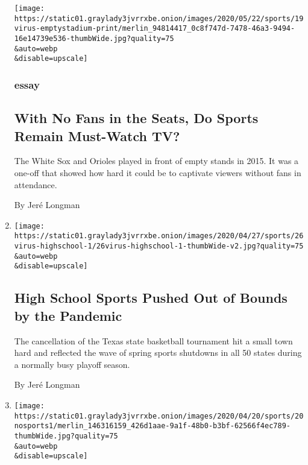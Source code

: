 \begin{enumerate}
  \texttt{[image: https://static01.graylady3jvrrxbe.onion/images/2020/05/22/sports/19virus-emptystadium-print/merlin\_94814417\_0c8f747d-7478-46a3-9494-16e14739e536-thumbWide.jpg?quality=75\\\&auto=webp\\\&disable=upscale]}

  \hypertarget{essay}{%
  \subsubsection{essay}\label{essay}}

  \hypertarget{with-no-fans-in-the-seats-do-sports-remain-must-watch-tv}{%
  \subsection{With No Fans in the Seats, Do Sports Remain Must-Watch
  TV?}\label{with-no-fans-in-the-seats-do-sports-remain-must-watch-tv}}

  The White Sox and Orioles played in front of empty stands in 2015. It
  was a one-off that showed how hard it could be to captivate viewers
  without fans in attendance.

  By Jeré Longman
\item
  \href{/2020/04/26/sports/coronavirus-high-school-sports.html}{}

  \texttt{[image: https://static01.graylady3jvrrxbe.onion/images/2020/04/27/sports/26virus-highschool-1/26virus-highschool-1-thumbWide-v2.jpg?quality=75\\\&auto=webp\\\&disable=upscale]}

  \hypertarget{high-school-sports-pushed-out-of-bounds-by-the-pandemic}{%
  \subsection{High School Sports Pushed Out of Bounds by the
  Pandemic}\label{high-school-sports-pushed-out-of-bounds-by-the-pandemic}}

  The cancellation of the Texas state basketball tournament hit a small
  town hard and reflected the wave of spring sports shutdowns in all 50
  states during a normally busy playoff season.

  By Jeré Longman
\item
  \href{/2020/04/20/sports/German-Silva-treadmill-drive-in-soccer-virus.html}{}

  \texttt{[image: https://static01.graylady3jvrrxbe.onion/images/2020/04/20/sports/20nosports1/merlin\_146316159\_426d1aae-9a1f-48b0-b3bf-62566f4ec789-thumbWide.jpg?quality=75\\\&auto=webp\\\&disable=upscale]}


\end{enumerate}
